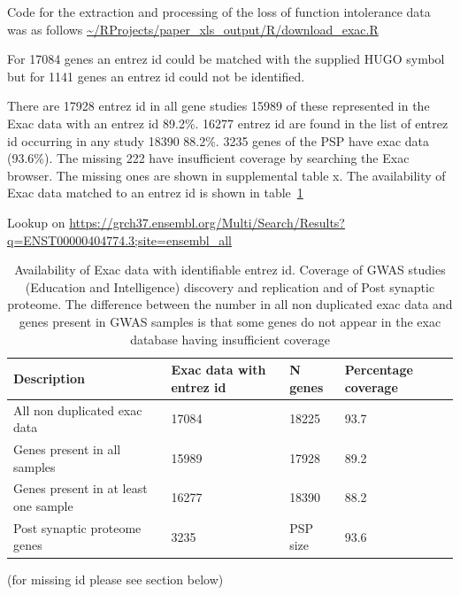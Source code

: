 Code for the extraction and processing of the loss of function intolerance data was as follows 
\url{~/RProjects/paper_xls_output/R/download_exac.R}

For 17084 genes an entrez id could be matched with the supplied HUGO symbol but for 1141 genes an entrez id could not be identified. 

There are 17928 entrez id in all gene studies
15989 of these represented in the Exac data with an entrez id
89.2\%. 16277 entrez id are found in the list of entrez id occurring in any study 18390 88.2\%. 3235 genes of the PSP have exac data (93.6\%). The missing 222 have insufficient coverage by searching the Exac browser. The missing ones are shown in supplemental table x. The availability of Exac data matched to an entrez id is shown in table~\ref{tab:exac_coverage}

Lookup on \url{https://grch37.ensembl.org/Multi/Search/Results?q=ENST00000404774.3;site=ensembl_all}

\begin{table}[]
    \centering
    \begin{tabular}{llll}
    \toprule
      Description   & Exac data with entrez id & N genes & Percentage coverage  \\
      \midrule
      All non duplicated exac data  & 17084 & 18225 & 93.7\\
       Genes present in all samples  & 15989 & 17928 & 89.2\\
       Genes present in at least one sample & 16277 & 18390 & 88.2\\
       Post synaptic proteome genes & 3235 & PSP size & 93.6\\
       \bottomrule
    \end{tabular}
    \caption{Availability of Exac data with identifiable entrez id. Coverage of GWAS studies (Education and Intelligence) discovery and replication and of Post synaptic proteome. The difference between the number in all non duplicated exac data and genes present in GWAS samples is that some genes do not appear in the exac database having insufficient coverage}
    \label{tab:exac_coverage}
\end{table}

(for missing id please see section below)






